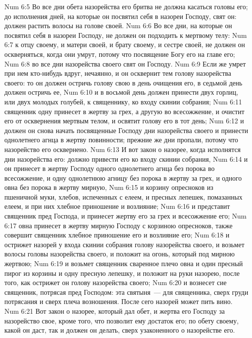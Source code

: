 \vs Num 6:5 Во все дни обета назорейства его бритва не должна касаться головы его; до исполнения дней, на которые он посвятил себя в назореи Господу, свят он: должен растить волосы на голове своей.
\vs Num 6:6 Во все дни, на которые он посвятил себя в назореи Господу, не должен он подходить к мертвому телу:
\vs Num 6:7  к отцу своему, и матери своей, и брату своему, и сестре своей, не должен он оскверняться, когда они умрут, потому что посвящение Богу его на главе его;
\vs Num 6:8 во все дни назорейства своего свят он Господу.
\vs Num 6:9 Если же умрет при нем кто-нибудь вдруг, нечаянно, и он осквернит тем голову назорейства своего: то он должен остричь голову свою в день очищения его, в седьмой день должен остричь ее,
\vs Num 6:10 и в восьмой день должен принести двух горлиц, или двух молодых голубей, к священнику, ко входу скинии собрания;
\vs Num 6:11 священник одну  принесет в жертву за грех, а другую во всесожжение, и очистит его от осквернения мертвым телом, и освятит голову его в тот день;
\vs Num 6:12 и должен он снова начать посвященные Господу дни назорейства своего и принести однолетнего агнца в жертву повинности; прежние же дни пропали, потому что назорейство его осквернено.
\vs Num 6:13 И вот закон о назорее, когда исполнятся дни назорейства его: должно привести его ко входу скинии собрания,
\vs Num 6:14 и он принесет в жертву Господу одного однолетнего агнца без порока во всесожжение, и одну однолетнюю агницу без порока в жертву за грех, и одного овна без порока в жертву мирную,
\vs Num 6:15 и корзину опресноков из пшеничной муки, хлебов, испеченных с елеем, и пресных лепешек, помазанных елеем, и при них хлебное приношение и возлияние;
\vs Num 6:16 и представит  священник пред Господа, и принесет жертву его за грех и всесожжение его;
\vs Num 6:17 овна принесет в жертву мирную Господу с корзиною опресноков, также совершит священник хлебное приношение его и возлияние его;
\vs Num 6:18 и острижет назорей у входа скинии собрания голову назорейства своего, и возьмет волосы головы назорейства своего, и положит на огонь, который под мирною жертвою;
\vs Num 6:19 и возьмет священник сваренное плечо овна и один пресный пирог из корзины и одну пресную лепешку, и положит на руки назорею, после того, как острижет он голову назорейства своего;
\vs Num 6:20 и вознесет сие священник, потрясая пред Господом: эта святыня~--- для священника, сверх груди потрясания и сверх плеча возношения. После сего назорей может пить вино.
\vs Num 6:21 Вот закон о назорее, который дал обет, и жертва его Господу за назорейство свое, кроме того, что позволит ему достаток его; по обету своему, какой он даст, так и должен он делать, сверх узаконенного о назорействе его.
